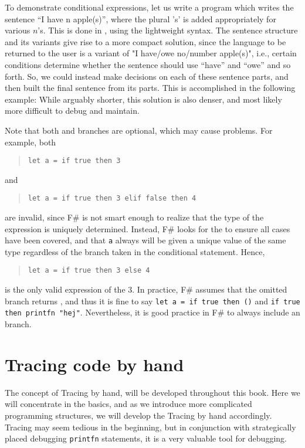 \documentclass[fsharpNotes.tex]{subfiles}
\begin{document}
To demonstrate conditional expressions, let us write a program which writes the sentence ``I have n apple(s)'', where the plural 's' is added appropriately for various $n$'s. This is done in , using the lightweight syntax.
%
%
The sentence structure and its variants give rise to a more compact solution, since the language to be returned to the user is a variant of "I have/owe no/number apple(s)", i.e., certain conditions determine whether the sentence should use ``have'' and ``owe'' and so forth. So, we could instead make decisions on each of these sentence parts, and then built the final sentence from its parts. This is accomplished in the following example:
%
%
While arguably shorter, this solution is also denser, and most likely more difficult to debug and maintain.

Note that both  and  branches are optional, which may cause problems. For example, both
\begin{quote}
\mbox{\lstinline!let a = if true then 3!}
\end{quote}
and
\begin{quote}
\mbox{\lstinline!let a = if true then 3 elif false then 4!}
\end{quote}
are invalid, since F\# is not smart enough to realize that the type of the expression is uniquely determined. Instead, F\# looks for the  to ensure all cases have been covered, and that \lstinline!a! always will be given a unique value of the same type regardless of the branch taken in the conditional statement. Hence,
\begin{quote}
\mbox{\lstinline!let a = if true then 3 else 4!}
\end{quote}
is the only valid expression of the 3. In practice, F\# assumes that the omitted branch returns \lexeme{()}, and thus it is fine to say \mbox{\lstinline!let a = if true then ()!} and \mbox{\lstinline!if true then printfn "hej"!}. Nevertheless, it is good practice in F\# to always include an  branch.

\section{Tracing code by hand}
The concept of Tracing by hand, will be developed throughout this book. Here we will concentrate in the basics, and as we introduce more complicated programming structures, we will develop the Tracing by hand accordingly. Tracing may seem tedious in the beginning, but in conjunction with strategically placed debugging \lstinline!printfn! statements, it is a very valuable tool for debugging.
\end{document}
